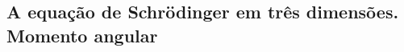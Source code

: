 \subsection{A equação de Schrödinger em três dimensões. Momento angular}
\label{ssec:three_dimensional_schrodinger}